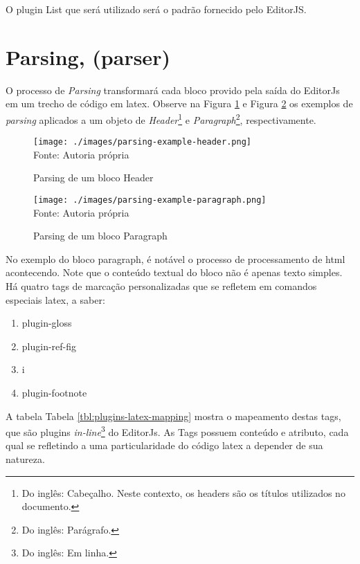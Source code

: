 O plugin List que será utilizado será o padrão fornecido pelo
EditorJS.

\section{Parsing, (parser)}

O processo de \textit{Parsing} transformará cada bloco provido
pela saída do EditorJs em um trecho de código em
\acrshort{latex}.
Observe na
Figura \ref{fig:parsing-example-header}
e
Figura \ref{fig:parsing-example-paragraph}
os exemplos de \textit{parsing} aplicados a um objeto de
\textit{Header}\footnote{Do inglês: Cabeçalho. Neste contexto, os headers são os títulos utilizados no documento.
}
e
\textit{Paragraph}\footnote{Do inglês: Parágrafo.
},
respectivamente.

\begin{figure}[H]
    \centering
    \caption{Parsing de um bloco Header}
    \texttt{[image: ./images/parsing-example-header.png]}
    \label{fig:parsing-example-header} \\
    \textnormal{\fontsize{10pt}{12pt}Fonte: Autoria própria}
\end{figure}

\begin{figure}[H]
    \centering
    \caption{Parsing de um bloco Paragraph}
    \texttt{[image: ./images/parsing-example-paragraph.png]}
    \label{fig:parsing-example-paragraph} \\
    \textnormal{\fontsize{10pt}{12pt}Fonte: Autoria própria}
\end{figure}

No exemplo do bloco paragraph, é notável o processo de
processamento de
\acrshort{html}
acontecendo. Note que o conteúdo textual do bloco
não é apenas texto simples. Há quatro tags de
marcação personalizadas que se refletem em comandos
especiais
\acrshort{latex}, a saber:

\begin{enumerate}
        
	\item plugin-gloss
	\item plugin-ref-fig
	\item i
	\item plugin-footnote
    
\end{enumerate}

A tabela
Tabela \ref{tbl:plugins-latex-mapping}
mostra o mapeamento destas tags, que são plugins
\textit{in-line}\footnote{Do inglês: Em linha.
}
do EditorJs. As Tags possuem conteúdo e atributo, cada qual se
refletindo a uma particularidade do código
\acrshort{latex}
a depender de sua natureza.

